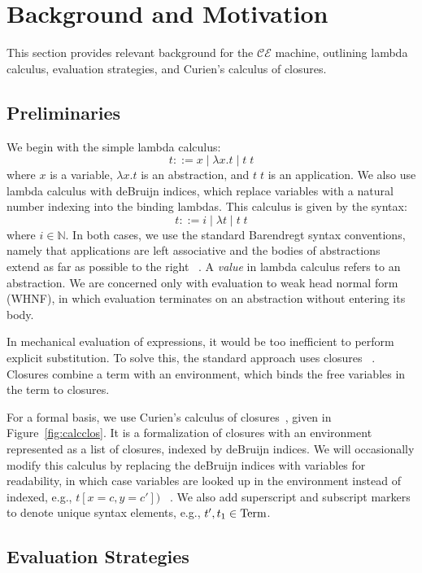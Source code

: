 \section{Background and Motivation} \label{sec:back}

This section provides relevant background for the $\mathcal{CE}$ machine,
outlining lambda calculus, evaluation strategies, and Curien's calculus of
closures.

\subsection{Preliminaries}

We begin with the simple lambda calculus:  $$ t::= x \; | \;  \lambda x.t \; |
\;  t \; t $$ where $x$ is a variable, $\lambda x.t$ is an abstraction, and $t
\; t$ is an application. We also use lambda calculus with deBruijn indices,
which replace variables with a natural number indexing into the binding lambdas.
This calculus is given by the syntax: $$ t::= i \; | \; \lambda t \; | \; t \; t
$$ where $i \in \mathbb{N}$. In both cases, we use the standard Barendregt
syntax conventions, namely that applications are left associative and the bodies
of abstractions extend as far as possible to the right
~\cite{barendregt1984lambda}.  A \emph{value} in lambda calculus refers to an
abstraction. We are concerned only with evaluation to weak head normal form
(WHNF), in which evaluation terminates on an abstraction without entering its
body.

In mechanical evaluation of expressions, it would be too inefficient to perform
explicit substitution. To solve this, the standard approach uses closures
~\cite{landin1964mechanical,curien1991abstract,jonesstg,biernacka2007concrete}.
Closures combine a term with an environment, which binds the free variables in
the term to closures. 

For a formal basis, we use Curien's calculus of
closures~\cite{curien1991abstract}, given in Figure~\ref{fig:calcclos}.  It is a
formalization of closures with an environment represented as a list of closures,
indexed by deBruijn indices. We will occasionally modify this calculus by
replacing the deBruijn indices with variables for readability, in which case
variables are looked up in the environment instead of indexed, e.g., $t[x = c, y
= c'])$ ~\cite{barendregt1984lambda}. We also add superscript and subscript
markers to denote unique syntax elements, e.g., $t', t_1 \in \textnormal{Term}$. 

\subsection{Evaluation Strategies} \label{sec:eval}

